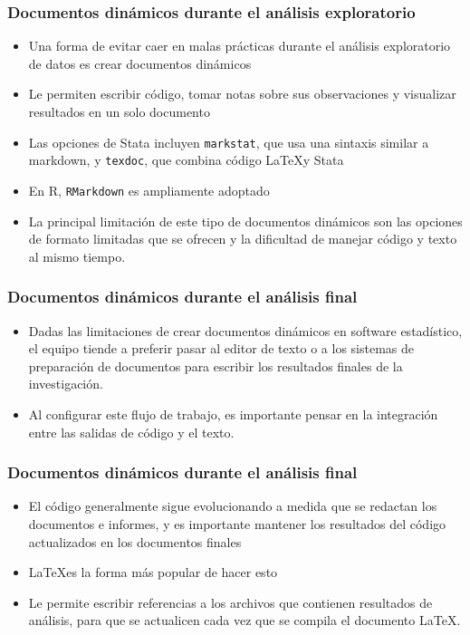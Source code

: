 \documentclass[10pt, aspectratio=169, compress]{beamer}
\begin{document}
\begin{frame}
	\frametitle{Documentos dinámicos durante el análisis exploratorio}
	\begin{itemize}
		\item Una forma de evitar caer en malas prácticas durante el análisis exploratorio de datos es crear documentos dinámicos
		\item Le permiten escribir código, tomar notas sobre sus observaciones y visualizar resultados en un solo documento
		\item Las opciones de Stata incluyen \texttt{markstat}, que usa una sintaxis similar a markdown, y \texttt{texdoc}, que combina código \LaTeX y Stata
		\item En R, \texttt{RMarkdown} es ampliamente adoptado
		\item La principal limitación de este tipo de documentos dinámicos son las opciones de formato limitadas que se ofrecen y la dificultad de manejar código y texto al mismo tiempo.
	\end{itemize}
\end{frame}
\begin{frame}
	\frametitle{Documentos dinámicos durante el análisis final}
	\begin{itemize}
		\item Dadas las limitaciones de crear documentos dinámicos en software estadístico, el equipo tiende a preferir pasar al editor de texto o a los sistemas de preparación de documentos para escribir los resultados finales de la investigación.
		\item Al configurar este flujo de trabajo, es importante pensar en la integración entre las salidas de código y el texto.
	\end{itemize}
\end{frame}
\begin{frame}
	\frametitle{Documentos dinámicos durante el análisis final}
	\begin{itemize}
		\item El código generalmente sigue evolucionando a medida que se redactan los documentos e informes, y es importante mantener los resultados del código actualizados en los documentos finales
		\item \LaTeX es la forma más popular de hacer esto
		\item Le permite escribir referencias a los archivos que contienen resultados de análisis, para que se actualicen cada vez que se compila el documento \LaTeX.
	\end{itemize}
\end{frame}	
\end{document}
